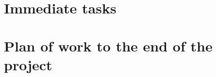 \documentclass[11pt]{article}
\begin{document}
  
    
  \section{Immediate tasks}

  \section{Plan of work to the end of the project}
\end{document}
